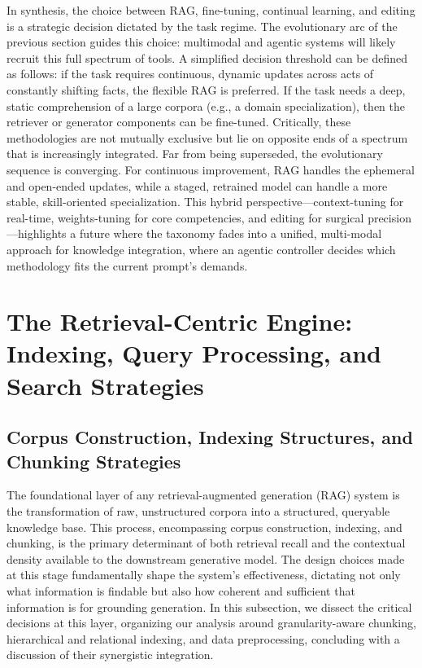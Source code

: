 \documentclass[11pt,a4paper]{article}
\begin{document}
In synthesis, the choice between RAG, fine-tuning, continual learning, and editing is a strategic decision dictated by the task regime. The evolutionary arc of the previous section guides this choice: multimodal and agentic systems will likely recruit this full spectrum of tools. A simplified decision threshold can be defined as follows: if the task requires continuous, dynamic updates across acts of constantly shifting facts, the flexible RAG is preferred. If the task needs a deep, static comprehension of a large corpora (e.g., a domain specialization), then the retriever or generator components can be fine-tuned. Critically, these methodologies are not mutually exclusive but lie on opposite ends of a spectrum that is increasingly integrated. Far from being superseded, the evolutionary sequence is converging. For continuous improvement, RAG handles the ephemeral and open-ended updates, while a staged, retrained model can handle a more stable, skill-oriented specialization. This hybrid perspective---context-tuning for real-time, weights-tuning for core competencies, and editing for surgical precision---highlights a future where the taxonomy fades into a unified, multi-modal approach for knowledge integration, where an agentic controller decides which methodology fits the current prompt's demands.


\section{The Retrieval-Centric Engine: Indexing, Query Processing, and Search Strategies}



\subsection{Corpus Construction, Indexing Structures, and Chunking Strategies}


The foundational layer of any retrieval-augmented generation (RAG) system is the transformation of raw, unstructured corpora into a structured, queryable knowledge base. This process, encompassing corpus construction, indexing, and chunking, is the primary determinant of both retrieval recall and the contextual density available to the downstream generative model. The design choices made at this stage fundamentally shape the system's effectiveness, dictating not only what information is findable but also how coherent and sufficient that information is for grounding generation. In this subsection, we dissect the critical decisions at this layer, organizing our analysis around granularity-aware chunking, hierarchical and relational indexing, and data preprocessing, concluding with a discussion of their synergistic integration.
\end{document}

